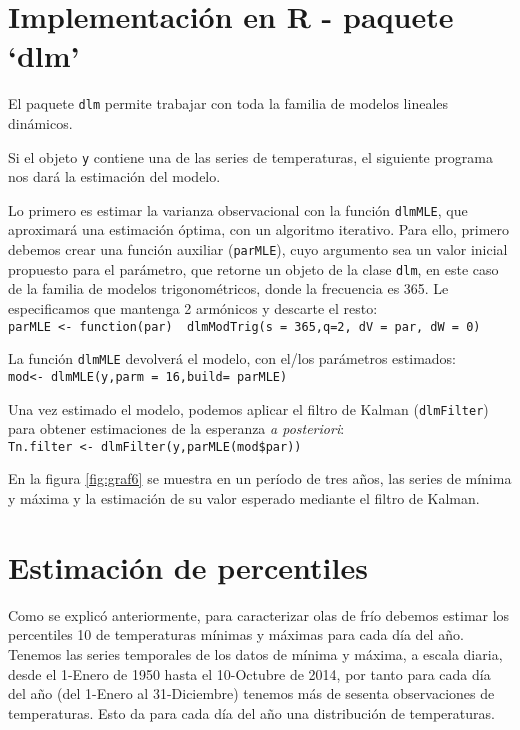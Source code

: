 \documentclass{article}\usepackage[]{graphicx}\usepackage[]{color}
\begin{document}
\section{Implementación en R - paquete `dlm'}

El paquete \verb|dlm| permite trabajar con toda la familia de modelos lineales dinámicos. %

Si el objeto \verb|y| contiene una de las series de temperaturas, el siguiente programa nos dará la estimación del modelo.

Lo primero es estimar la varianza observacional con la función \verb|dlmMLE|, que aproximará una estimación óptima, con un algoritmo iterativo. Para ello, primero debemos crear una función auxiliar (\verb|parMLE|), cuyo argumento sea un valor inicial propuesto para el parámetro, que retorne un objeto de la clase \verb|dlm|, en este caso de la familia de modelos trigonométricos, donde la frecuencia es 365. Le especificamos que mantenga 2 armónicos y descarte el resto:\\
\verb|parMLE <- function(par)  dlmModTrig(s = 365,q=2, dV = par, dW = 0)|

La función \verb|dlmMLE| devolverá el modelo, con el/los parámetros estimados:\\
\verb|mod<- dlmMLE(y,parm = 16,build= parMLE)|

Una vez estimado el modelo, podemos aplicar el filtro de Kalman (\verb|dlmFilter|) para obtener estimaciones de la esperanza \textit{a posteriori}:\\
\verb|Tn.filter <- dlmFilter(y,parMLE(mod$par))|

En la figura \ref{fig:graf6} se muestra en un período de tres años, las series de mínima y máxima y la estimación de su valor esperado mediante el filtro de Kalman.

\section{Estimación de percentiles}

Como se explicó anteriormente, para caracterizar olas de frío debemos estimar los percentiles 10 de temperaturas mínimas y máximas para cada día del año. Tenemos las series temporales de los datos de mínima y máxima, a escala diaria, desde el 1-Enero de 1950 hasta el 10-Octubre de 2014, por tanto para cada día del año (del 1-Enero al 31-Diciembre) tenemos más de sesenta observaciones de temperaturas. Esto da para cada día del año una distribución de temperaturas.  %
\end{document}
